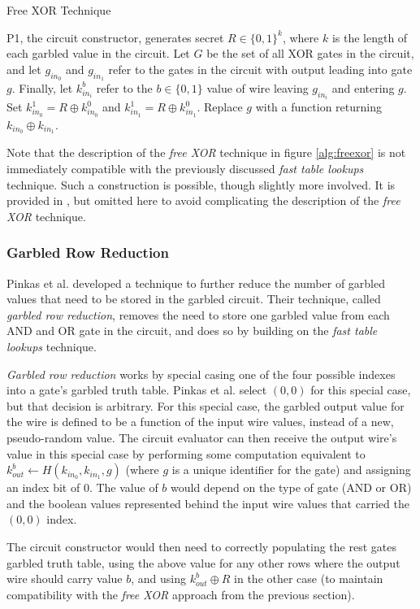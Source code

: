 \begin{algorithm}[H]
    \caption{Free XOR Technique}
    \label{alg:freexor}
    \begin{algorithmic}[1]
        \STATE \ac{P1}, the circuit constructor, generates secret $R \in \{0, 1\}^{k}$, where $k$ is the length of each garbled value in the circuit.
        \STATE Let $G$ be the set of all XOR gates in the circuit, and let $g_{in_0}$ and $g_{in_1}$ refer to the gates in the circuit with output leading into gate $g$. Finally, let $k^b_{in_i}$ refer to the $b \in \{0, 1\}$ value of wire leaving $g_{in_i}$ and entering $g$.
            \STATE Set $k^1_{in_0} =  R \oplus k^0_{in_0}$ and $k^1_{in_1} =  R \oplus k^0_{in_1}$.
            \STATE Replace $g$ with a function returning $k_{in_0} \oplus k_{in_1}$.
        \ENDFOR
    \end{algorithmic}
\end{algorithm}

Note that the description of the \emph{free XOR} technique in figure \ref{alg:freexor} is not immediately compatible with the previously discussed \emph{fast table lookups} technique.  Such a construction is possible, though slightly more involved.  It is provided in \cite{kreuter2012billion}, but omitted here to avoid complicating the description of the \emph{free XOR} technique.


\subsubsection{Garbled Row Reduction}
\label{sec:grr}

Pinkas et al.\cite{pinkas2009secure} developed a technique to further reduce the number of garbled values that need to be stored in the garbled circuit.  Their technique, called \emph{garbled row reduction}, removes the need to store one garbled value from each AND and OR gate in the circuit, and does so by building on the \emph{fast table lookups} technique.

\emph{Garbled row reduction} works by special casing one of the four possible indexes into a gate's garbled truth table.  Pinkas et al. select $(0, 0)$ for this special case, but that decision is arbitrary.  For this special case, the garbled output value for the wire is defined to be a function of the input wire values, instead of a new, pseudo-random value. The circuit evaluator can then receive the output wire's value in this special case by performing some computation equivalent to $k^b_{out} \gets H(k_{in_0}, k_{in_1}, g)$ (where $g$ is a unique identifier for the gate) and assigning an index bit of 0. The value of $b$ would depend on the type of gate (AND or OR) and the boolean values represented behind the input wire values that carried the $(0, 0)$ index.

The circuit constructor would then need to correctly populating the rest gates garbled truth table, using the above value for any other rows where the output wire should carry value $b$, and using $k^b_{out} \oplus R$ in the other case (to maintain compatibility with the \emph{free XOR} approach from the previous section).


